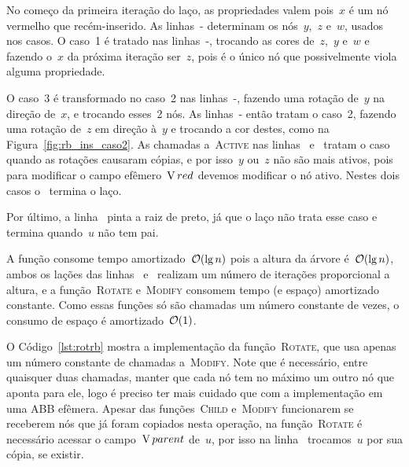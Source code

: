 \documentclass[main.tex]{subfiles}
\begin{document}
No começo da primeira iteração do laço, as propriedades valem pois~$x$ é um nó vermelho que recém-inserido. As linhas~- determinam os nós~$y$,~$z$ e~$w$, usados nos casos. O caso~1 é tratado nas linhas~-, trocando as cores de~$z$,~$y$ e~$w$ e fazendo o~$x$ da próxima iteração ser~$z$, pois é o único nó que possivelmente viola alguma propriedade.

O caso~3 é transformado no caso~2 nas linhas~-, fazendo uma rotação de~$y$ na direção de~$x$, e trocando esses~2 nós. As linhas~- então tratam o caso~2, fazendo uma rotação de~$z$ em direção à~$y$ e trocando a cor destes, como na Figura~\ref{fig:rb_ins_caso2}. As chamadas a~\textsc{Active} nas linhas~ e~ tratam o caso quando as rotações causaram cópias, e por isso~$y$ ou~$z$ não são mais ativos, pois para modificar o campo efêmero~$\operatorname{V}{red}$ devemos modificar o nó ativo. Nestes dois casos o~ termina o laço.

Por último, a linha~ pinta a raiz de preto, já que o laço não trata esse caso e termina quando~$u$ não tem pai.

A função consome tempo amortizado~$\mathcal{O}(\lg n)$ pois a altura da árvore é~$\mathcal{O}(\lg n)$, ambos os lações das linhas~ e~ realizam um número de iterações proporcional a altura, e a função~\textsc{Rotate} e~\textsc{Modify} consomem tempo (e espaço) amortizado constante. Como essas funções só são chamadas um número constante de vezes, o consumo de espaço é amortizado~$\mathcal{O}(1)$.

O Código~\ref{lst:rotrb} mostra a implementação da função~\textsc{Rotate}, que usa apenas um número constante de chamadas a~\textsc{Modify}. Note que é necessário, entre quaisquer duas chamadas, manter que cada nó tem no máximo um outro nó que aponta para ele, logo é preciso ter mais cuidado que com a implementação em uma ABB efêmera. Apesar das funções~\textsc{Child} e~\textsc{Modify} funcionarem se receberem nós que já foram copiados nesta operação, na função~\textsc{Rotate} é necessário acessar o campo~$\operatorname{V}{parent}$ de~$u$, por isso na linha~ trocamos~$u$ por sua cópia, se existir.
\end{document}

